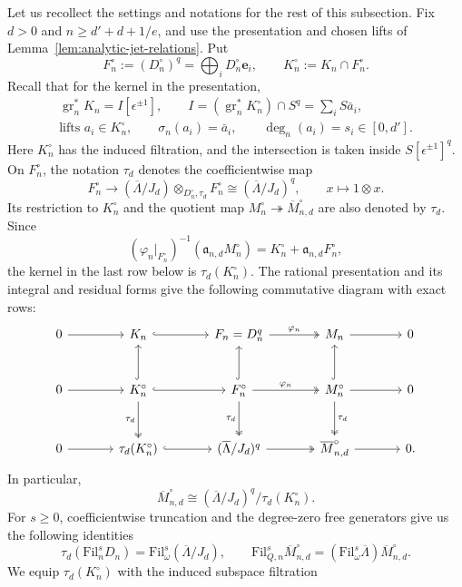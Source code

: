 \documentclass[11pt]{article}
\theoremstyle{definition}
\newcommand{\gr}{\operatorname{gr}}
\begin{document}
Let us recollect the settings and notations for the rest of this subsection.
Fix $d>0$ and $n\geq d'+d+1/e$,
and use the presentation and chosen lifts of
Lemma~\ref{lem:analytic-jet-relations}. Put
\[
 F_n^\circ:=(D_n^\circ)^{q}=\bigoplus_iD_n^\circ\mathbf e_i,
 \qquad K_n^\circ:=K_n\cap F_n^\circ.
\]
Recall that for the kernel in the presentation,
\[
 \begin{gathered}
 \gr_n^*K_n=I[\epsilon^{\pm1}],\qquad
 I=(\gr_n^*K_n^\circ)\cap S^{q}=\sum_iS\bar a_i,\\
 \text{lifts }a_i\in K_n^\circ,\qquad
 \sigma_n(a_i)=\bar a_i,\qquad
 \deg_n(a_i)=s_i\in[0,d'].
 \end{gathered}
\]
Here $K_n^\circ$ has the induced filtration, and the intersection is taken
inside $S[\epsilon^{\pm1}]^{q}$. On $F_n^\circ$, the notation $\tau_d$
denotes the coefficientwise map
\[
 F_n^\circ\longrightarrow
 (\overline\Lambda/J_d)\otimes_{D_n^\circ,\tau_d}F_n^\circ
 \cong(\overline\Lambda/J_d)^{q},\qquad
 x\longmapsto1\otimes x.
\]
Its restriction to $K_n^\circ$ and the quotient map
$M_n^\circ\twoheadrightarrow\overline M_{n,d}^\circ$ are also denoted by
$\tau_d$. Since
\[
 (\varphi_n|_{F_n^\circ})^{-1}(\mathfrak a_{n,d}M_n^\circ)
 =K_n^\circ+\mathfrak a_{n,d}F_n^\circ,
\]
the kernel in the last row below is $\tau_d(K_n^\circ)$.
The rational presentation and its integral and residual forms
give the following commutative diagram with exact rows:
\[
\begin{tikzcd}[column sep=large,row sep=large]
 0\arrow[r]
 &K_n\arrow[r,hook]
 &F_n=D_n^{q}\arrow[r,two heads,"\varphi_n"]
 &M_n\arrow[r]&0\\
 0\arrow[r]
 &K_n^\circ\arrow[r,hook]\arrow[u,hook]
    \arrow[d,two heads,"\tau_d"']
 &F_n^\circ\arrow[r,two heads,"\varphi_n"]\arrow[u,hook]
    \arrow[d,two heads,"\tau_d"']
 &M_n^\circ\arrow[r]\arrow[u,hook]
    \arrow[d,two heads,"\tau_d"]&0\\
 0\arrow[r]
 &\tau_d(K_n^\circ)\arrow[r,hook]
 &(\overline\Lambda/J_d)^{q}\arrow[r,two heads]
 &\overline M_{n,d}^\circ\arrow[r]&0.
\end{tikzcd}
\]
In particular,
\[
 \overline{M}_{n,d}^{\circ}
 \cong(\overline\Lambda/J_d)^{q}/\tau_d(K_n^\circ).
\]
For $s\geq0$, coefficientwise truncation and the degree-zero free generators give us the following identities
\[
 \tau_d(\mathrm{Fil}_n^sD_n)
   =\mathrm{Fil}_\omega^s(\overline\Lambda/J_d),\qquad
 \mathrm{Fil}_{Q,n}^s\overline{M}_{n,d}^{\circ}
   =(\mathrm{Fil}_\omega^s\overline\Lambda)\overline{M}_{n,d}^{\circ}.
\]
We equip $\tau_d(K_n^\circ)$ with the induced subspace filtration
\end{document}
